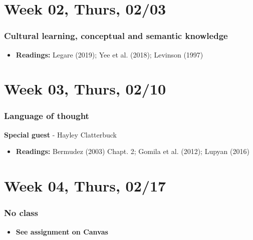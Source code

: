 \documentclass[11pt,man]{article}
\providecommand{\tightlist}{%
  \setlength{\itemsep}{0pt}\setlength{\parskip}{0pt}}
\begin{document}
\hypertarget{week-02-thurs-0203}{%
\section{Week 02, Thurs, 02/03}\label{week-02-thurs-0203}}

\hypertarget{cultural-learning-conceptual-and-semantic-knowledge}{%
\subsubsection{Cultural learning, conceptual and semantic
knowledge}\label{cultural-learning-conceptual-and-semantic-knowledge}}

\begin{itemize}
\tightlist
\item
  \textbf{Readings:} Legare (2019); Yee et al. (2018); Levinson (1997)
\end{itemize}

\hypertarget{week-03-thurs-0210}{%
\section{Week 03, Thurs, 02/10}\label{week-03-thurs-0210}}

\hypertarget{language-of-thought}{%
\subsubsection{Language of thought}\label{language-of-thought}}

\textbf{Special guest} - Hayley Clatterbuck

\begin{itemize}
\tightlist
\item
  \textbf{Readings:} Bermudez (2003) Chapt. 2; Gomila et al. (2012);
  Lupyan (2016)
\end{itemize}

\hypertarget{week-04-thurs-0217}{%
\section{Week 04, Thurs, 02/17}\label{week-04-thurs-0217}}

\hypertarget{no-class}{%
\subsubsection{No class}\label{no-class}}

\begin{itemize}
\tightlist
\item
  \textbf{See assignment on Canvas}
\end{itemize}
\end{document}
